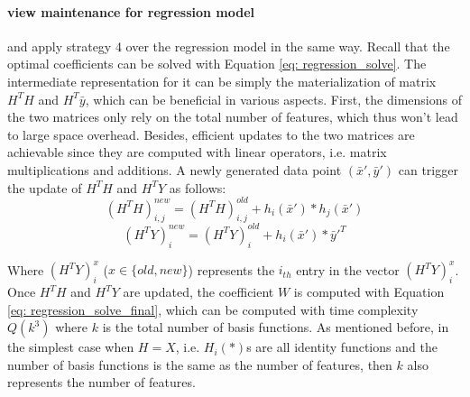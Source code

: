 \paragraph{view maintenance for regression model} \cite{deshpande2006mauvedb} and \cite{gupta2015processing} apply strategy 4 over the regression model in the same way. Recall that the optimal coefficients can be solved with Equation \ref{eq: regression_solve}. The intermediate representation for it can be simply the materialization of matrix $H^TH$ and $H^T\bar{y}$, which can be beneficial in various aspects. First, the dimensions of the two matrices only rely on the total number of features, which thus won't lead to large space overhead. Besides, efficient updates to the two matrices are achievable since they are computed with linear operators, i.e. matrix multiplications and additions. A newly generated data point $(\bar{x}',\bar{y}')$ can trigger the update of $H^TH$ and $H^TY$ as follows:
\begin{equation}
    (H^TH)^{new}_{i,j} = (H^TH)^{old}_{i,j} + h_i(\bar{x}')*h_j(\bar{x}')
\end{equation}
\begin{equation}
    (H^TY)^{new}_i = (H^TY)^{old}_i + h_i(\bar{x}')*\bar{y}'^T
\end{equation}

Where $(H^TY)^{x}_i$ ($x \in \{old, new\}$) represents the $i_{th}$ entry in the vector $(H^TY)^{x}_i$. Once $H^TH$ and $H^TY$ are updated, the coefficient $W$ is computed with Equation \ref{eq: regression_solve_final}, 
which can be computed with time complexity $Q(k^3)$ where $k$ is the total number of basis functions. As mentioned before, in the simplest case when $H=X$, i.e. $H_i(*)$s are all identity functions and the number of basis functions is the same as the number of features, then $k$ also represents the number of features.

